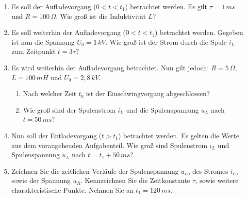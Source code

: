 {    \begin{enumerate}
        \item[a)] Es soll der Aufladevorgang ($0<t<t_1$) betrachtet werden. Es gilt $\tau = 1\,ms$ und $R=100\,\Omega$. Wie groß ist die Induktivität $L$?
        \item[b)] Es soll weiterhin der Aufladevorgang ($0<t<t_1$) betrachtet werden. Gegeben ist nun die Spannung $U_0=1\,kV$. Wie groß ist der Strom durch die Spule $i_L$ zum Zeitpunkt $t=3\tau$?
        \item[c)] Es wird weiterhin der Aufladevorgang betrachtet. Nun gilt jedoch: $R = 5\,\Omega$, $L=100\,mH$ und $U_0=2,8\,kV$.
        \begin{enumerate}
        \item[c1)] Nach welcher Zeit $t_0$ ist der Einschwingvorgang abgeschlossen?
        \item[c2)] Wie groß sind der Spulenstrom $i_L$ und die Spulenspannung $u_L$ nach $t=50\,ms$?
        \end{enumerate}
        \item[d)] Nun soll der Entladevorgang ($t>t_1$) betrachtet werden. Es gelten die Werte aus dem vorangehenden Aufgabenteil. Wie groß sind Spulenstrom $i_L$ und Spulenspannung $u_L$ nach $t=t_1 +50\,ms$?
        \item[e)] Zeichnen Sie die zeitlichen Verläufe der Spulenspannung $u_L$, des Stromes $i_L$, sowie der Spannung $u_R$. Kennzeichnen Sie die Zeitkonstante $\tau$, sowie weitere charakteristische Punkte. Nehmen Sie an $t_1 = 120\,ms$.
    \end{enumerate}
}

